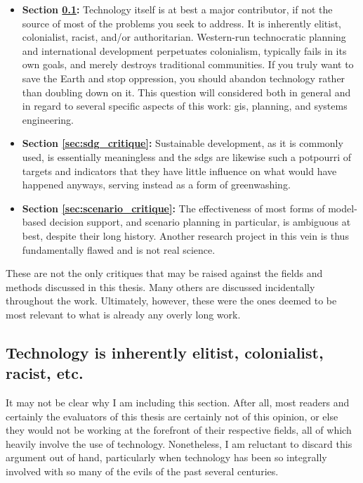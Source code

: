\begin{itemize} \setlength{\itemsep}{0pt} \setlength{\parskip}{0pt} 
	\item{\textbf{Section \ref{sec:elitism}:} Technology itself is at best a major contributor, if not the source of most of the problems you seek to address. It is inherently elitist, colonialist, racist, and/or authoritarian. Western-run technocratic planning and international development perpetuates colonialism, typically fails in its own goals, and merely destroys traditional communities. If you truly want to save the Earth and stop oppression, you should abandon technology rather than doubling down on it. This question will considered both in general and in regard to several specific aspects of this work: \ac{gis}, planning, and systems engineering.}	
	\item{\textbf{Section \ref{sec:sdg_critique}:} Sustainable development, as it is commonly used, is essentially meaningless and the \acp{sdg} are likewise such a potpourri of targets and indicators that they have little influence on what would have happened anyways, serving instead as a form of greenwashing.}
	\item{\textbf{Section \ref{sec:scenario_critique}:} The effectiveness of most forms of model-based decision support, and scenario planning in particular, is ambiguous at best, despite their long history. Another research project in this vein is thus fundamentally flawed and is not real science.}	
\end{itemize}

These are not the only critiques that may be raised against the fields and methods discussed in this thesis. Many others are discussed incidentally throughout the work. Ultimately, however, these were the ones deemed to be most relevant to what is already any overly long work.


\subsection{Technology is inherently elitist, colonialist, racist, etc.} \label{sec:elitism}

It may not be clear why I am including this section. After all, most readers and certainly the evaluators of this thesis are certainly not of this opinion, or else they would not be working at the forefront of their respective fields, all of which heavily involve the use of technology. Nonetheless, I am reluctant to discard this argument out of hand, particularly when technology has been so integrally involved with so many of the evils of the past several centuries.

